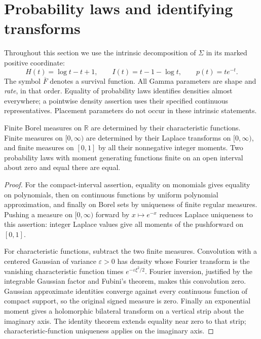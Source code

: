 \section{Probability laws and identifying transforms}
\label{final:probability}

Throughout this section we use the intrinsic decomposition of $\Sigma$
in its marked positive coordinate:
\[
 H(t)=\log t-t+1,\qquad I(t)=t-1-\log t,\qquad
 p(t)=t e^{-t}.
\]
The symbol $\overline F$ denotes a survival function.
All Gamma parameters are shape and
\emph{rate}, in that order.  Equality of probability laws identifies
densities almost everywhere; a pointwise density assertion uses their
specified continuous representatives.  Placement parameters do not
occur in these intrinsic statements.

\begin{proposition}
\label{final:P0-uniqueness}
Finite Borel measures on $\mathbb R$ are determined by their
characteristic functions.  Finite measures on $[0,\infty)$ are
determined by their Laplace transforms on $[0,\infty)$, and finite
measures on $[0,1]$ by all their nonnegative integer moments.
Two probability laws with moment generating functions finite on
an open interval about zero and equal there are equal.
\end{proposition}
\begin{proof}
For the compact-interval assertion, equality on monomials gives
equality on polynomials, then on continuous functions by uniform
polynomial approximation, and finally on Borel sets by uniqueness
of finite regular measures.  Pushing a measure on $[0,\infty)$ forward
by $x\mapsto e^{-x}$ reduces Laplace uniqueness to this assertion:
integer Laplace values give all moments of the pushforward on $[0,1]$.

For characteristic functions, subtract the two finite measures.
Convolution with a centered Gaussian of variance $\varepsilon>0$
has density whose Fourier transform is the vanishing characteristic
function times $e^{-\varepsilon\xi^2/2}$.  Fourier inversion, justified
by the integrable Gaussian factor and Fubini's theorem, makes this
convolution zero.  Gaussian approximate identities converge against
every continuous function of compact support, so the original signed
measure is zero.  Finally an exponential moment gives a holomorphic
bilateral transform on a vertical strip about the imaginary axis.
The identity theorem extends equality near zero to that strip;
characteristic-function uniqueness applies on the imaginary axis.
\end{proof}

